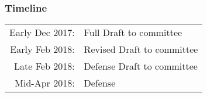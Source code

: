\documentclass[Proposal]{subfiles}
\begin{document}
%
\begin{frame}
  \frametitle{Timeline}
  \begin{tabular}[t]{rl}
    Early Dec 2017: & Full Draft to committee \\
    Early Feb 2018: & Revised Draft to committee \\
    Late Feb 2018: & Defense Draft to committee \\
    Mid-Apr 2018: & Defense \\
  \end{tabular}
\end{frame}
\end{document}
